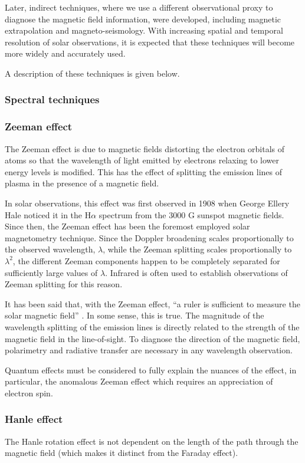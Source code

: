 \documentclass[12pt]{../style-files/ociamthesis}
\begin{document}
Later, indirect techniques, where we use a different observational proxy to diagnose the magnetic field information, were developed, including magnetic extrapolation and magneto-seismology. With increasing spatial and temporal resolution of solar observations, it is expected that these techniques will become more widely and accurately used.

A description of these techniques is given below.

\subsubsection{Spectral techniques}
\subsubsection{Zeeman effect}
The Zeeman effect is due to magnetic fields distorting the electron orbitals of atoms so that the wavelength of light emitted by electrons relaxing to lower energy levels is modified. This has the effect of splitting the emission lines of plasma in the presence of a magnetic field.

In solar observations, this effect was first observed in 1908 when George Ellery Hale noticed it in the H$\alpha$ spectrum from the 3000 G sunspot magnetic fields. Since then, the Zeeman effect has been the foremost employed solar magnetometry  technique. Since the Doppler broadening scales proportionally to the observed wavelength, $\lambda$, while the Zeeman splitting scales proportionally to $\lambda^2$, the different Zeeman components happen to be completely separated for sufficiently large values of $\lambda$. Infrared is often used to establish observations of Zeeman splitting for this reason.

It has been said that, with the Zeeman effect, “a ruler is sufficient to measure the solar magnetic field” \citep{lan03}. In some sense, this is true. The magnitude of the wavelength splitting of the emission lines is directly related to the strength of the magnetic field in the line-of-sight. To diagnose the direction of the magnetic field, polarimetry and radiative transfer are necessary in any wavelength observation.

Quantum effects must be considered to fully explain the nuances of the effect, in particular, the anomalous Zeeman effect which requires an appreciation of electron spin.

\subsubsection{Hanle effect}
The Hanle rotation effect is not dependent on the length of the path through the magnetic field (which makes it distinct from the Faraday effect). 
\end{document}
